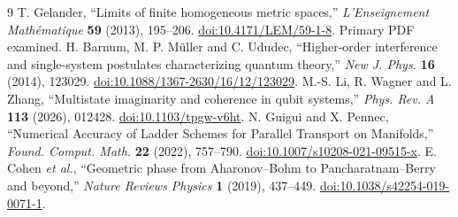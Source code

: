 \documentclass[11pt,a4paper]{article}
\begin{document}
\begin{thebibliography}{9}\small
{} T. Gelander, ``Limits of finite homogeneous metric spaces,'' \emph{L'Enseignement Math\'ematique} \textbf{59} (2013), 195--206. \href{https://doi.org/10.4171/LEM/59-1-8}{doi:10.4171/LEM/59-1-8}. Primary PDF examined.
 H. Barnum, M. P. M\"uller and C. Ududec, ``Higher-order interference and single-system postulates characterizing quantum theory,'' \emph{New J. Phys.} \textbf{16} (2014), 123029. \href{https://doi.org/10.1088/1367-2630/16/12/123029}{doi:10.1088/1367-2630/16/12/123029}.
 M.-S. Li, R. Wagner and L. Zhang, ``Multistate imaginarity and coherence in qubit systems,'' \emph{Phys. Rev. A} \textbf{113} (2026), 012428. \href{https://doi.org/10.1103/tpgw-v6ht}{doi:10.1103/tpgw-v6ht}.
 N. Guigui and X. Pennec, ``Numerical Accuracy of Ladder Schemes for Parallel Transport on Manifolds,'' \emph{Found. Comput. Math.} \textbf{22} (2022), 757--790. \href{https://doi.org/10.1007/s10208-021-09515-x}{doi:10.1007/s10208-021-09515-x}.
 E. Cohen \emph{et al.}, ``Geometric phase from Aharonov--Bohm to Pancharatnam--Berry and beyond,'' \emph{Nature Reviews Physics} \textbf{1} (2019), 437--449. \href{https://doi.org/10.1038/s42254-019-0071-1}{doi:10.1038/s42254-019-0071-1}.
\end{thebibliography}
\end{document}
